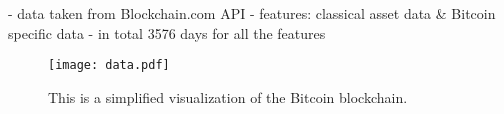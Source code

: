 - data taken from Blockchain.com API \cite{Data}
- features: classical asset data \& Bitcoin specific data
- in total 3576 days for all the features

\begin{figure}
  \centering
  \texttt{[image: data.pdf]}
  \caption{This is a simplified visualization of the Bitcoin blockchain.}
\end{figure}